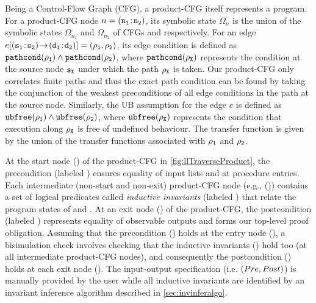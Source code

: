 Being a Control-Flow Graph (CFG), a product-CFG itself represents a program.
For a product-CFG node $n = ({\tt n_1\!:\!n_2})$, its symbolic state $\Omega_n$ is the union of
the symbolic states $\Omega_{n_1}$ and $\Omega_{n_2}$ of CFGs \sprog{} and \cprog{} respectively.
For an edge $e[{\small ({\tt s_1\!:\!s_2}) \! \rightarrow \! ({\tt d_1\!:\!d_2})}]=({\tt \rho_{1}},{\tt \rho_{2}})$, its edge condition is defined
as ${{\tt pathcond}({\tt \rho_{1}})} \land {\ensuremath{{\tt pathcond}({\tt \rho_{2}})}}$, where ${{\tt pathcond}({\tt \rho_{X}})}$ represents
the condition at the source node ${\tt s_X}$ under which the path ${\tt \rho_{X}}$ is taken.
Our product-CFG only correlates finite paths and thus the exact path condition can be found by taking the
conjunction of the weakest preconditions of all edge conditions in the path at the source node.
Similarly, the UB assumption for the edge $e$ is defined as ${{\tt ubfree}({\tt \rho_{1}})} \land {\ensuremath{{\tt ubfree}({\tt \rho_{2}})}}$,
where ${{\tt ubfree}({\tt \rho_{X}})}$ represents the condition that execution along ${\tt \rho_{X}}$ is free of
undefined behaviour.
The transfer function is given by the union of the transfer functions associated with ${\tt \rho_{1}}$
and ${\tt \rho_{2}}$.

At the start node () of the product-CFG in \cref{fig:llTraverseProduct},
the precondition \pre{} (labeled )
ensures equality of input lists  and  at procedure entries.
Each intermediate (non-start and non-exit) product-CFG node (e.g., ()) contains a set of logical predicates called
{\em inductive invariants} (labeled ) that relate the program states of \sprog{} and \cprog{}.
At an exit node () of the product-CFG, the postcondition \post{} (labeled )
represents equality of observable outputs and forms our top-level proof obligation.
Assuming that the precondition \pre{} () holds at the entry node (),
a bisimulation check involves checking that the inductive invariants () hold too (at all intermediate product-CFG nodes),
and consequently the postcondition \post{} () holds at each exit node ().
The input-output specification (i.e. $({Pre}{},{Post}{})$) is manually provided by the user
while all inductive invariants are identified by an invariant inference algorithm described in \cref{sec:invinferalgo}.

